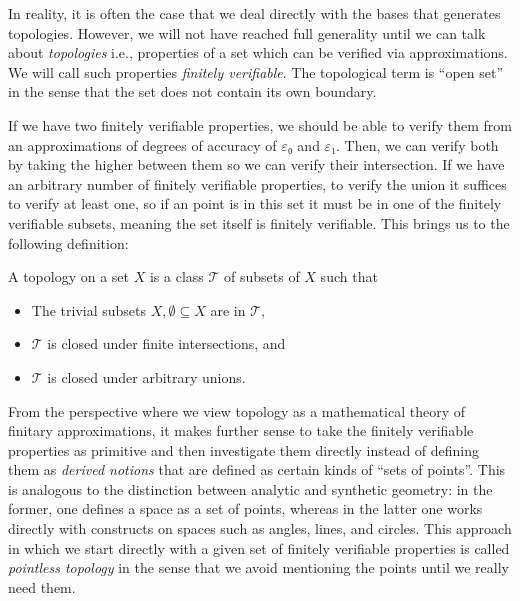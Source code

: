 In reality, it is often the case that we deal directly with the bases that generates
topologies. However, we will not have reached full generality until we can talk about
\emph{topologies} i.e., properties of a set which can be verified via approximations.
We will call such properties \emph{finitely verifiable}. The topological term is ``open
set'' in the sense that the set does not contain its own boundary.

If we have two finitely verifiable properties, we should be able to verify them from an
approximations of degrees of accuracy of $ε₀$ and $ε₁$. Then, we can verify both by taking
the higher between them so we can verify their intersection. If we have an arbitrary
number of finitely verifiable properties, to verify the union it suffices to verify at
least one, so if an point is in this set it must be in one of the finitely verifiable
subsets, meaning the set itself is finitely verifiable. This brings us to the following
definition:
\begin{defn}\label{defn:topospace}
  A topology on a set $X$ is a class $\mathcal{T}$ of subsets of $X$ such that
  \begin{itemize}
    \item The trivial subsets $X, \emptyset \subseteq X$ are in $\mathcal{T}$,
    \item $\mathcal{T}$ is closed under finite intersections, and
    \item $\mathcal{T}$ is closed under arbitrary unions.
  \end{itemize}
\end{defn}

From the perspective where we view topology as a mathematical theory of finitary
approximations, it makes further sense to take the finitely verifiable properties as
primitive and then investigate them directly instead of defining them as \emph{derived
notions} that are defined as certain kinds of ``sets of points''. This is analogous to
the distinction between analytic and synthetic geometry: in the former, one defines a
space as a set of points, whereas in the latter one works directly with constructs on
spaces such as angles, lines, and circles. This approach in which we start directly with
a given set of finitely verifiable properties is called \emph{pointless topology} in the
sense that we avoid mentioning the points until we really need them.

